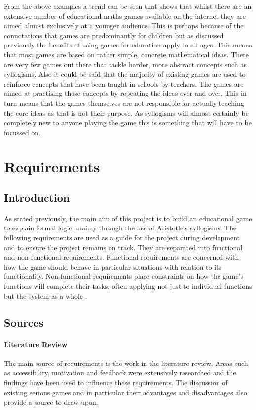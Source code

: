 \documentclass[12pt,a4paper]{report}
\begin{document}
From the above examples a trend can be seen that shows that whilst there are an extensive number of educational maths games available on the internet they are aimed almost exclusively at a younger audience. This is perhaps because of the connotations that games are predominantly for children but as discussed previously the benefits of using games for education apply to all ages. This means that most games are based on rather simple, concrete mathematical ideas. There are very few games out there that tackle harder, more abstract concepts such as syllogisms. Also it could be said that the majority of existing games are used to reinforce concepts that have been taught in schools by teachers. The games are aimed at practising those concepts by repeating the ideas over and over. This in turn means that the games themselves are not responsible for actually teaching the core ideas as that is not their purpose. As syllogisms will almost certainly be completely new to anyone playing the game this is something that will have to be focussed on.


\chapter{Requirements}
\section{Introduction}
As stated previously, the main aim of this project is to build an educational game to explain formal logic, mainly through the use of Aristotle's syllogisms. The following requirements are used as a guide for the project during development and to ensure the project remains on track. They are separated into functional and non-functional requirements. Functional requirements are concerned with how the game should behave in particular situations with relation to its functionality. 
Non-functional requirements place constraints on how the game's functions will complete their tasks, often applying not just to individual functions but the system as a whole \citep{Sommerville:2006:SE:1196763}.

\section{Sources}
\subsubsection{Literature Review}
The main source of requirements is the work in the literature review. Areas such as accessibility, motivation and feedback were extensively researched and the findings have been used to influence these requirements. The discussion of existing serious games and in particular their advantages and disadvantages also provide a source to draw upon.
\end{document}
